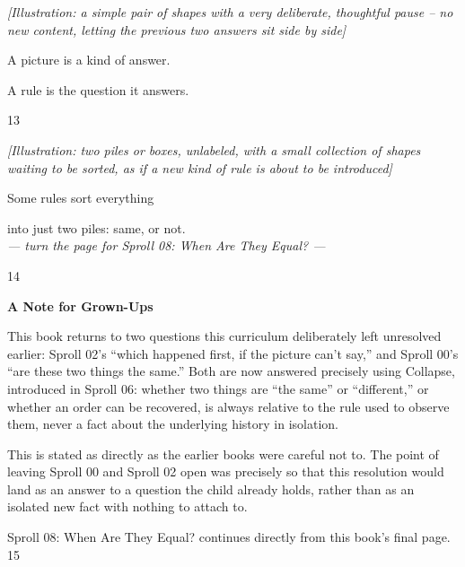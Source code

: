 \documentclass[12pt]{book}
\newcommand{\artnote}[1]{{\color{gray!70}\small\itshape [Illustration: #1]}\par\vspace{0.3in}}
\newcommand{\bigline}[1]{{\Huge #1}\par}
\newcommand{\pagenum}[1]{\vfill{\color{gray!50}\footnotesize #1}}
\newcommand{\sprollpage}{\newpage\vspace*{0.4in}}
\begin{document}
\sprollpage
\begin{center}
\vspace*{0.6in}
\artnote{a simple pair of shapes with a very deliberate, thoughtful pause -- no new content, letting the previous two answers sit side by side}
\vspace{0.35in}
\bigline{A picture is a kind of answer.}\vspace{0.1in}
{\Large A rule is the question it answers.}
\end{center}
\pagenum{13}

\sprollpage
\begin{center}
\vspace*{0.5in}
\artnote{two piles or boxes, unlabeled, with a small collection of shapes waiting to be sorted, as if a new kind of rule is about to be introduced}
\vspace{0.3in}
\bigline{Some rules sort everything}\vspace{0.1in}
{\Large into just two piles: same, or not.}
\vspace{0.3in}\\
{\small \textit{--- turn the page for Sproll 08: When Are They Equal? ---}}
\end{center}
\pagenum{14}

\sprollpage
\vspace*{0.3in}
{\large \textbf{A Note for Grown-Ups}}
\vspace{0.2in}

\normalsize
This book returns to two questions this curriculum deliberately left unresolved earlier: Sproll 02's ``which happened first, if the picture can't say,'' and Sproll 00's ``are these two things the same.'' Both are now answered precisely using Collapse, introduced in Sproll 06: whether two things are ``the same'' or ``different,'' or whether an order can be recovered, is always relative to the rule used to observe them, never a fact about the underlying history in isolation.

\vspace{0.15in}
This is stated as directly as the earlier books were careful not to. The point of leaving Sproll 00 and Sproll 02 open was precisely so that this resolution would land as an answer to a question the child already holds, rather than as an isolated new fact with nothing to attach to.

\vspace{0.3in}
{\small Sproll 08: When Are They Equal? continues directly from this book's final page.}
\pagenum{15}
\end{document}
